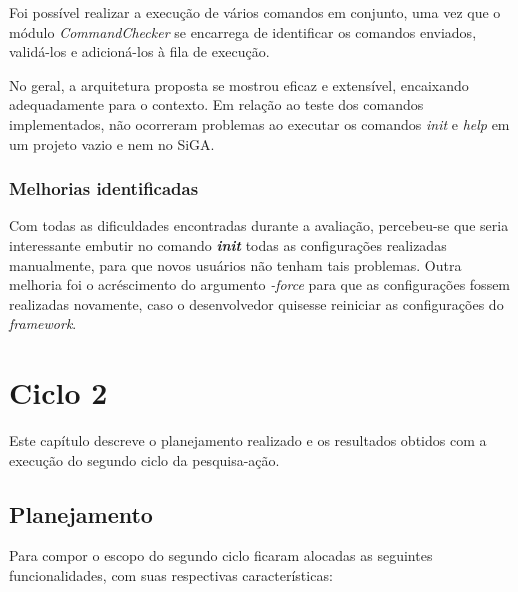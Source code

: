 	  Foi possível realizar a execução de vários comandos em conjunto, uma vez que o módulo \textit{CommandChecker} se encarrega 
	  de identificar os comandos enviados, validá-los e adicioná-los à fila de execução.
	  
	  No geral, a arquitetura proposta se mostrou eficaz e extensível, encaixando adequadamente para o contexto.
	  Em relação ao teste dos comandos implementados, não ocorreram problemas ao executar os comandos \textit{init} e
	  \textit{help} em um projeto vazio e nem no SiGA.
	  

    \subsection{Melhorias identificadas}
	   Com todas as dificuldades encontradas durante a avaliação, percebeu-se que seria interessante embutir no comando 
	   \textit{\textbf{init}} todas as configurações realizadas manualmente, para que novos usuários não tenham tais problemas. Outra melhoria foi o acréscimento do argumento 
     \textit{-force} para que as configurações fossem realizadas novamente, caso o desenvolvedor quisesse reiniciar as configurações do \textit{framework}.
    

\chapter{Ciclo 2}

  Este capítulo descreve o planejamento realizado e os resultados obtidos com a execução do segundo ciclo da pesquisa-ação.
  
  \section{Planejamento}
  
    Para compor o escopo do segundo ciclo ficaram alocadas as seguintes funcionalidades, com suas respectivas características:
    
